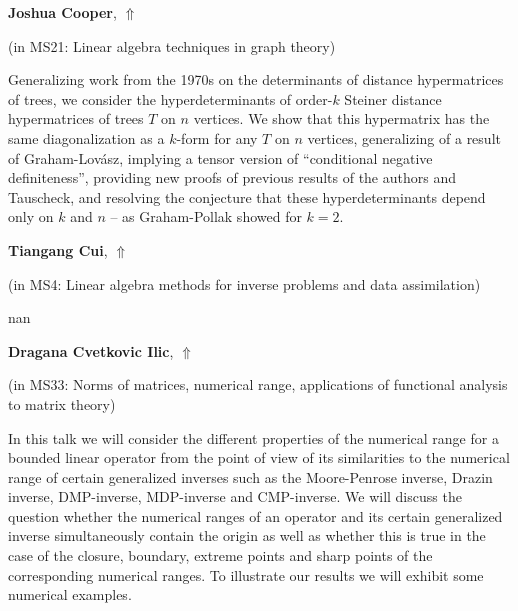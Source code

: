 \documentclass[ILAS2025-program.tex]{subfiles}
\begin{document}
     \hypertarget{down0379}{}\begin{ilasabstract}
    
    \textbf{Joshua Cooper},  \hfill \hyperlink{up0379}{$\Uparrow$}
    
    (in {\color{mstitle}MS21: Linear algebra techniques in graph theory})
        
        \mtskip
    Generalizing work from the 1970s on the determinants of distance hypermatrices of trees, we consider the hyperdeterminants of order-$k$ Steiner distance hypermatrices of trees $T$ on $n$ vertices.  We show that this hypermatrix has the same diagonalization as a $k$-form for any $T$ on $n$ vertices, generalizing of a result of Graham-Lov\'{a}sz, implying a tensor version of ``conditional negative definiteness'', providing new proofs of previous results of the authors and Tauscheck, and resolving the conjecture that these hyperdeterminants depend only on $k$ and $n$ -- as Graham-Pollak showed for $k=2$.
\end{ilasabstract}
     \hypertarget{down0204}{}\begin{ilasabstract}
    
    \textbf{Tiangang Cui},  \hfill \hyperlink{up0204}{$\Uparrow$}
    
    (in {\color{mstitle}MS4: Linear algebra methods for inverse problems and data assimilation})
        
        \mtskip
    nan\end{ilasabstract}
     \hypertarget{down0245}{}\begin{ilasabstract}
    
    \textbf{Dragana Cvetkovic Ilic},  \hfill \hyperlink{up0245}{$\Uparrow$}
    
    (in {\color{mstitle}MS33: Norms of matrices, numerical range, applications of functional analysis to matrix theory})
        
        \mtskip
    In this talk we will consider the different properties of the numerical range for a bounded linear operator from the point of view of its similarities  to the numerical range  of certain generalized inverses such as the Moore-Penrose inverse, Drazin inverse, DMP-inverse, MDP-inverse and CMP-inverse.  We will discuss  the question whether the numerical ranges of an operator and its certain generalized inverse simultaneously contain the origin as well as whether this is true in the case of the closure, boundary, extreme points and sharp points of the corresponding numerical ranges.  To illustrate our results we will exhibit some numerical examples.
\end{ilasabstract}
\end{document}
